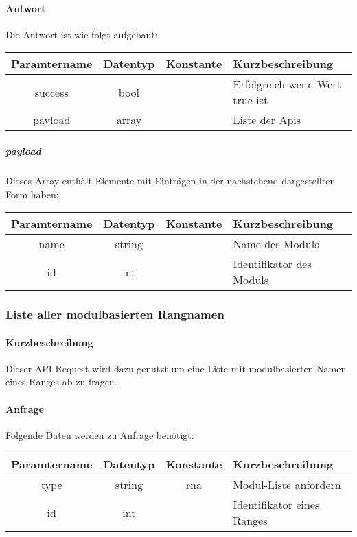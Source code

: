 \paragraph{Antwort}Die Antwort ist wie folgt aufgebaut:
\begin{table}[H]
	\begin{tabular}{|c|c|c|p{6.5cm}|}
		\hline
		\textbf{Paramtername} & \textbf{Datentyp} & \textbf{Konstante} & \textbf{Kurzbeschreibung}            \\ \hline                
		success             & bool             &                 & Erfolgreich wenn Wert {\glqq true\grqq} ist \\ \hline
		payload             & array            &                 & Liste der Apis \\ \hline
	\end{tabular}
\end{table}
\subparagraph{payload}Dieses Array enthält Elemente mit Einträgen in der nachstehend dargestellten Form haben:
\begin{table}[H]
	\begin{tabular}{|c|c|c|p{6.5cm}|}
		\hline
		\textbf{Paramtername} & \textbf{Datentyp} & \textbf{Konstante} & \textbf{Kurzbeschreibung}    \\ \hline
		name               & string            &                 & Name des Moduls \\ \hline
		id                 & int               &                 & Identifikator des Moduls \\ \hline
	\end{tabular}
\end{table}
\subsubsection{Liste aller modulbasierten Rangnamen}
\paragraph{Kurzbeschreibung}Dieser API-Request wird dazu genutzt um eine Liste mit modulbasierten Namen eines Ranges ab zu fragen.
\paragraph{Anfrage}Folgende Daten werden zu Anfrage benötigt:
\begin{table}[H]
	\begin{tabular}{|c|c|c|p{6.5cm}|}
		\hline
		\textbf{Paramtername} & \textbf{Datentyp} & \textbf{Konstante} & \textbf{Kurzbeschreibung}                                                                                               \\ \hline
		type                & string            & rna                & Modul-Liste anfordern \\ \hline
		id                  & int               &                    & Identifikator eines Ranges \\ \hline
	\end{tabular}
\end{table}
